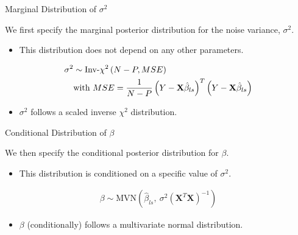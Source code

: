 \documentclass{beamer}\usepackage[]{graphicx}\usepackage[]{color}
\begin{document}

\begin{frame}{Marginal Distribution of $\sigma^2$}
 
  We first specify the marginal posterior distribution for the noise variance,
  $\sigma^2$.
  \vc
  \begin{itemize}
  \item This distribution does not depend on any other parameters.
  \end{itemize}
  \begin{align}
    \sigma^2 &\sim \text{Inv-}\chi^2 \left(N - P, MSE \right) \label{sigma2PosteriorEq}\\
    &\text{with } MSE = \frac{1}{N - P} \left( Y - \mathbf{X}\hat{\beta}_{ls} \right)^T \left( Y - \mathbf{X}\hat{\beta}_{ls} \right) \notag
  \end{align}
  \begin{itemize}
  \item $\sigma^2$ follows a scaled inverse $\chi^2$ distribution.
  \end{itemize}

\end{frame}


\begin{frame}{Conditional Distribution of $\beta$}

  We then specify the conditional posterior distribution for $\beta$. 
  \vc
  \begin{itemize}
  \item This distribution is conditioned on a specific value of $\sigma^2$.
  \end{itemize}
  \begin{align}
    \beta \sim \text{MVN} \left( \hat{\beta}_{ls}, ~ \sigma^2 (\mathbf{X}^T \mathbf{X})^{-1} \right) \label{betaPosteriorEq}
  \end{align}
  \begin{itemize}
  \item $\beta$ (conditionally) follows a multivariate normal distribution.
  \end{itemize}

\end{frame}

\end{document}
